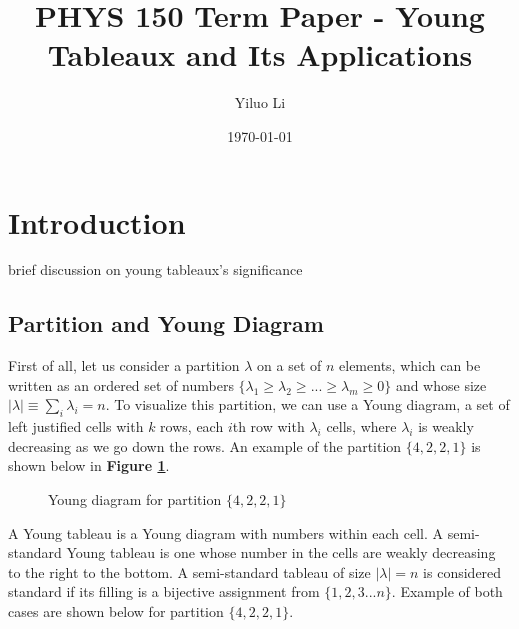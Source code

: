 \documentclass{amsart}
\theoremstyle{definition}
\theoremstyle{remark}
\numberwithin{equation}{section}
\newcommand{\abs}[1]{\lvert#1\rvert}
\begin{document}
\title{PHYS 150 Term Paper - Young Tableaux and Its Applications}

\author{Yiluo Li}
\address{College of Creative Studies, University of California, Santa Barbara, CA 93106}

\date{\today}


\maketitle

\section{Introduction}
brief discussion on young tableaux's significance

\subsection{Partition and Young Diagram}
First of all, let us consider a partition $\lambda$ on a set of $n$ elements, which can be written as an ordered set of numbers $\{\lambda_1\geq\lambda_2\geq...\geq\lambda_m\geq 0\}$ and whose size $\abs{\lambda}\equiv\sum_i\lambda_i=n$. To visualize this partition, we can use a Young diagram, a set of left justified cells with $k$ rows, each $i$th row with $\lambda_i$ cells, where $\lambda_i$ is weakly decreasing as we go down the rows. An example of the partition $\{4, 2, 2, 1\}$ is shown below in \textbf{Figure \ref{fig:young_diagram}}.
\begin{figure}[H]
	\centering
	\caption{Young diagram for partition $\{4,2,2,1\}$\label{fig:young_diagram}}
\end{figure}

A Young tableau is a Young diagram with numbers within each cell. A semi-standard Young tableau is one whose number in the cells are weakly decreasing to the right to the bottom. A semi-standard tableau of size $\abs{\lambda}=n$ is considered standard if its filling is a bijective assignment from $\{1, 2, 3...n\}$. Example of both cases are shown below for partition $\{4, 2, 2, 1\}$.
\end{document}
